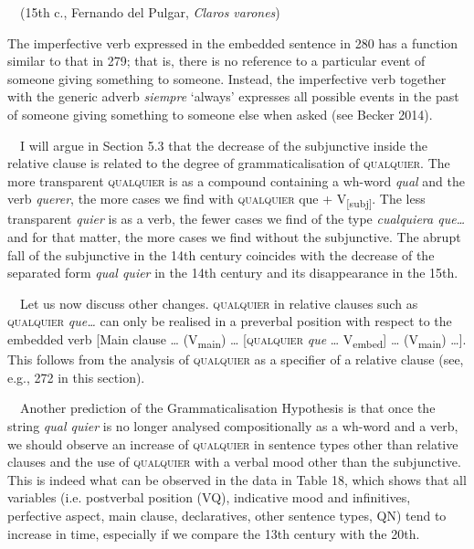 \begin{styleStandard}
\ \ (15th c., Fernando del Pulgar, \textit{Claros varones})
\end{styleStandard}

\begin{styleStandard}
The imperfective verb expressed in the embedded sentence in 280 has a function similar to that in 279; that is, there is no reference to a particular event of someone giving something to someone. Instead, the imperfective verb together with the generic adverb \textit{siempre} ‘always’ expresses all possible events in the past of someone giving something to someone else when asked (see Becker 2014).
\end{styleStandard}

\begin{styleStandard}
\ \ I will argue in Section 5.3 that the decrease of the subjunctive inside the relative clause is related to the degree of grammaticalisation of \textsc{qualquier}. The more transparent \textsc{qualquier} is as a compound containing a wh-word \textit{qual} and the verb \textit{querer}, the more cases we find with \textsc{qualquier} que + V\textsubscript{[subj]}. The less transparent \textit{quier} is as a verb, the fewer cases we find of the type \textit{cualquiera que…} and for that matter, the more cases we find without the subjunctive. The abrupt fall of the subjunctive in the 14th century coincides with the decrease of the separated form \textit{qual quier} in the 14th century and its disappearance in the 15th.
\end{styleStandard}

\begin{styleStandard}
\ \ Let us now discuss other changes. \textsc{qualquier} in relative clauses such as\textit{ }\textsc{qualquier} \textit{que…} can only be realised in a preverbal position with respect to the embedded verb [Main clause … (V\textsubscript{main}) … [\textsc{qualquier}\textit{ que} … V\textsubscript{embed}] … (V\textsubscript{main}) …]. This follows from the analysis of \textsc{qualquier} as a specifier of a relative clause (see, e.g., 272 in this section).
\end{styleStandard}

\begin{styleStandard}
\ \ Another prediction of the Grammaticalisation Hypothesis is that once the string \textit{qual quier} is no longer analysed compositionally as a wh-word and a verb, we should observe an increase of \textsc{qualquier} in sentence types other than relative clauses and the use of \textsc{qualquier} with a verbal mood other than the subjunctive. This is indeed what can be observed in the data in Table 18, which shows that all variables (i.e. postverbal position (VQ), indicative mood and infinitives, perfective aspect, main clause, declaratives, other sentence types, QN) tend to increase in time, especially if we compare the 13th century with the 20th.
\end{styleStandard}

